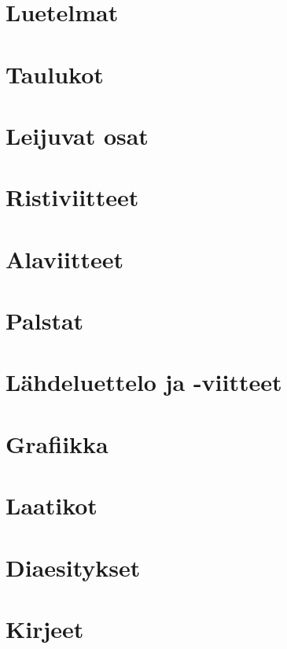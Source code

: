 

\section{Luetelmat}
\label{luku:luetelmat}
\section{Taulukot}
\label{luku:taulukot}
\section{Leijuvat osat}
\label{luku:leijuosat}
\section{Ristiviitteet}
\label{luku:ristiviitteet}
\section{Alaviitteet}
\label{luku:alaviitteet}
\section{Palstat}
\label{luku:palstat}
\section{Lähdeluettelo ja -viitteet}
\section{Grafiikka}
\label{luku:grafiikka}
\section{Laatikot}
\section{Diaesitykset}
\label{luku:diaesitykset}
\section{Kirjeet}
\label{luku:kirjeet}
